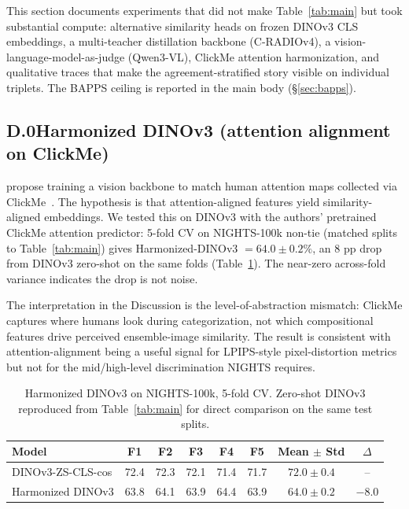 This section documents experiments that did not make Table~\ref{tab:main} but took substantial compute: alternative similarity heads on frozen DINOv3 CLS embeddings, a multi-teacher distillation backbone (C-RADIOv4), a vision-language-model-as-judge (Qwen3-VL), ClickMe attention harmonization, and qualitative traces that make the agreement-stratified story visible on individual triplets. The BAPPS ceiling is reported in the main body (\S\ref{sec:bapps}).

\subsection*{D.0\quad Harmonized DINOv3 (attention alignment on ClickMe)}

\citet{fel2022harmonization} propose training a vision backbone to match human attention maps collected via ClickMe~\citep{linsley2019clickme}. The hypothesis is that attention-aligned features yield similarity-aligned embeddings. We tested this on DINOv3 with the authors' pretrained ClickMe attention predictor: 5-fold CV on NIGHTS-100k non-tie (matched splits to Table~\ref{tab:main}) gives Harmonized-DINOv3 $= 64.0 \pm 0.2\%$, an 8 pp drop from DINOv3 zero-shot on the same folds (Table~\ref{tab:harm}). The near-zero across-fold variance indicates the drop is not noise.

The interpretation in the Discussion is the level-of-abstraction mismatch: ClickMe captures where humans look during categorization, not which compositional features drive perceived ensemble-image similarity. The result is consistent with attention-alignment being a useful signal for LPIPS-style pixel-distortion metrics but not for the mid/high-level discrimination NIGHTS requires.

\begin{table}[ht]
\caption{Harmonized DINOv3 on NIGHTS-100k, 5-fold CV. Zero-shot DINOv3 reproduced from Table~\ref{tab:main} for direct comparison on the same test splits.}
\label{tab:harm}
\centering
\small
\begin{tabular}{lccccccc}
\toprule
Model & F1 & F2 & F3 & F4 & F5 & Mean $\pm$ Std & $\Delta$ \\
\midrule
DINOv3-ZS-CLS-cos            & 72.4 & 72.3 & 72.1 & 71.4 & 71.7 & $72.0 \pm 0.4$ & --     \\
Harmonized DINOv3            & 63.8 & 64.1 & 63.9 & 64.4 & 63.9 & $64.0 \pm 0.2$ & $-8.0$ \\
\bottomrule
\end{tabular}
\end{table}

